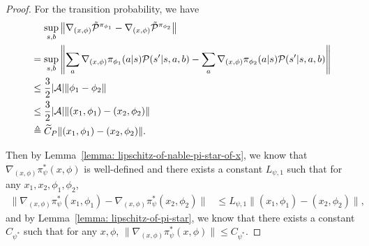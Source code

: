 \documentclass{article}
\theoremstyle{plain}
\theoremstyle{definition}
\theoremstyle{remark}
\def\cA{\mathcal A}
\def\cP{\mathcal P}
\def\bydef{\triangleq}
\begin{document}
\begin{proof}
    For the transition probability, we have
    \begin{align}
        & \quad \, \sup_{s,b} \left\| \nabla_{(x,\phi)} \tilde{\cP}^{\pi_{\phi_1}} -\nabla_{(x,\phi)} \tilde{\cP}^{\pi_{\phi_2}} \right\| \notag \\
        & = \sup_{s,b} \left\| \sum_a \nabla_{(x,\phi)} \pi_{\phi_1}(a|s) \cP(s^\prime|s,a,b) - \sum_a \nabla_{(x,\phi)} \pi_{\phi_2}(a|s) \cP(s^\prime|s,a,b) \right\| \notag\\
        & \leq \frac{3}{2} |\cA| \| \phi_1 - \phi_2 \| \notag\\
        & \leq \frac{3}{2} |\cA|\| (x_1,\phi_1) - (x_2,\phi_2) \| \notag \\
        & \bydef \widetilde{C}_P \| (x_1,\phi_1) - (x_2,\phi_2) \| .
    \end{align}

    Then by Lemma~\ref{lemma: lipschitz-of-nable-pi-star-of-x}, we know that $\nabla_{(x,\phi)} \pi^*_\psi(x,\phi)$ is well-defined and there exists a constant $L_{\psi,1}$ such that for any $x_1,x_2,\phi_1,\phi_2$,
    \begin{align}
        \| \nabla_{(x,\phi)}\pi_\psi^*(x_1,\phi_1) - \nabla_{(x,\phi)} \pi_\psi^*(x_2,\phi_2) \| & \leq L_{\psi,1} \| (x_1,\phi_1) - (x_2,\phi_2) \| ,
    \end{align}
    and by Lemma~\ref{lemma: lipschitz-of-pi-star}, we know that there exists a constant $C_{\psi^*}$ such that for any $x,\phi$, $\|\nabla_{(x,\phi)} \pi_\psi^*(x,\phi) \| \leq C_{\psi^*}$.


\end{proof}
\end{document}

